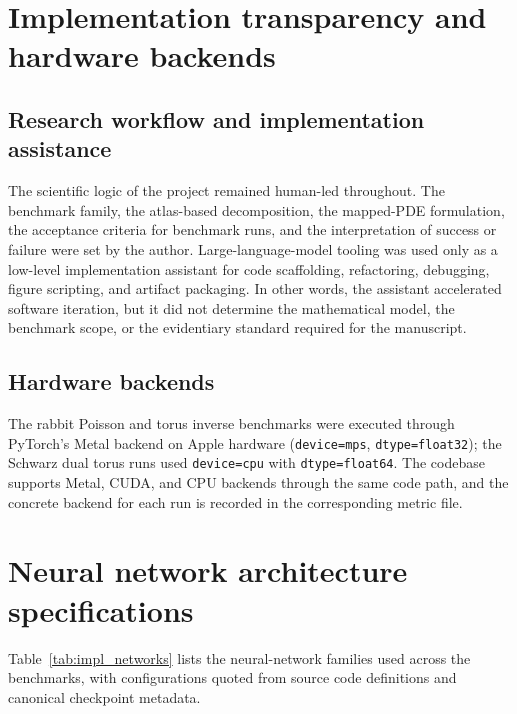 \documentclass[sort&compress]{svjour3} %
\begin{document}
\appendix
\section{Implementation transparency and hardware backends}
\label{sec:appendix_impl_details}

\subsection{Research workflow and implementation assistance}
The scientific logic of the project remained human-led throughout. The benchmark family, the atlas-based decomposition, the mapped-PDE formulation, the acceptance criteria for benchmark runs, and the interpretation of success or failure were set by the author. Large-language-model tooling was used only as a low-level implementation assistant for code scaffolding, refactoring, debugging, figure scripting, and artifact packaging. In other words, the assistant accelerated software iteration, but it did not determine the mathematical model, the benchmark scope, or the evidentiary standard required for the manuscript.

\subsection{Hardware backends}
The rabbit Poisson and torus inverse benchmarks were executed through PyTorch's Metal backend on Apple hardware (\texttt{device=mps}, \texttt{dtype=float32}); the Schwarz dual torus runs used \texttt{device=cpu} with \texttt{dtype=float64}. The codebase supports Metal, CUDA, and CPU backends through the same code path, and the concrete backend for each run is recorded in the corresponding metric file.

\section{Neural network architecture specifications}
\label{sec:appendix_architectures}

Table~\ref{tab:impl_networks} lists the neural-network families used across the benchmarks, with configurations quoted from source code definitions and canonical checkpoint metadata.
\end{document}
